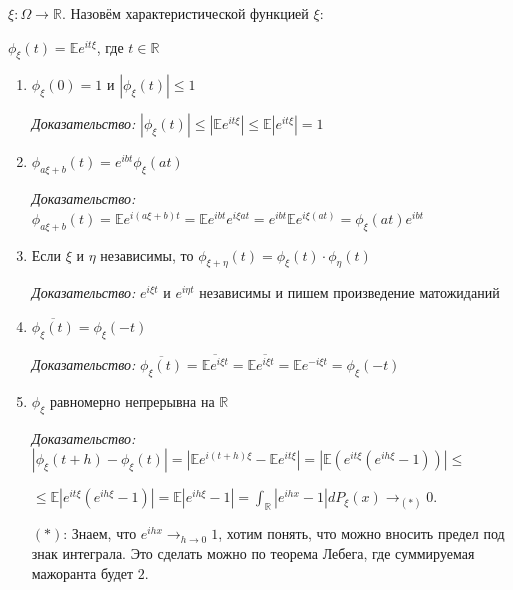 \begin{definition}
    $\xi : \Omega \to \mathbb{R}$. Назовём характеристической функцией $\xi$:

    $\phi_\xi (t) = \mathbb{E} e^{it\xi}$, где $t \in \mathbb{R}$
\end{definition}

\begin{properties}
    \begin{enumerate}
        \item {
            $\phi_\xi (0) = 1$ и $|\phi_\xi (t)| \leqslant 1$

            \textit{Доказательство: } $|\phi_\xi (t)| \leqslant |\mathbb{E} e^{it\xi}| \leqslant \mathbb{E}|e^{it\xi}| = 1$
        }
        \item {
            $\phi_{a\xi + b} (t) = e^{ibt} \phi_\xi (at)$

            \textit{Доказательство: } $\phi_{a\xi + b} (t) = \mathbb{E} e^{i(a \xi + b)t} = \mathbb{E} e^{ibt} e^{i\xi a t} = e^{ibt} \mathbb{E} e^{i\xi (at)} = \phi_{\xi} (at) e^{ibt} $
        }
        \item {
            Если $\xi$ и $\eta$ независимы, то $\phi_{\xi + \eta} (t) = \phi_\xi (t) \cdot \phi_{\eta} (t)$

            \textit{Доказательство: } $e^{i\xi t}$ и $e^{i \eta t}$ независимы и пишем произведение матожиданий
        }
        \item {
            $\overline{\phi_{\xi}(t)} = \phi_{\xi} (-t)$

            \textit{Доказательство: } $\overline{\phi_{\xi}(t)} = \overline{\mathbb{E} e^{i \xi t}} = \mathbb{E} \overline{e^{i \xi t}} = \mathbb{E} e^{-i \xi t} = \phi_\xi (-t)$
        }
        \item {
            $\phi_{\xi}$ равномерно непрерывна на $\mathbb{R}$

            \textit{Доказательство: } $|\phi_{\xi}(t + h) - \phi_{\xi}(t)| = | \mathbb{E} e^{i (t + h) \xi} - \mathbb{E} e^{i t \xi} | = | \mathbb{E} \left( e^{it \xi} (e^{i h \xi} - 1) \right) | \leq $
            
            $\leq \mathbb{E} \left| e^{it \xi} (e^{i h \xi} - 1) \right| = \mathbb{E} | e^{i h \xi} - 1 | = \int_{\mathbb{R}} | e^{i h x} - 1 | d P_{\xi}(x) \rightarrow_{(*)} 0$.

            $(*)$: Знаем, что $e^{i h x} \rightarrow_{h \to 0} 1$, хотим понять, что можно вносить предел под знак интеграла. Это сделать можно по теорема Лебега, где суммируемая мажоранта будет $2$.
            
            

        }
    \end{enumerate}
\end{properties}

